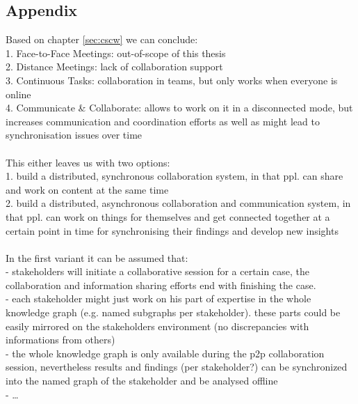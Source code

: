 
\begin{appendices}
\renewcommand{\appendixname}{APPENDIX}
\renewcommand{\appendixtocname}{\appendixname}
\addappheadtotoc


\part*{Appendix}

Based on chapter \ref{sec:cscw} we can conclude: \\
1. Face-to-Face Meetings: out-of-scope of this thesis \\
2. Distance Meetings: lack of collaboration support \\
3. Continuous Tasks: collaboration in teams, but only works when everyone is online \\
4. Communicate \& Collaborate: allows to work on it in a disconnected mode, but increases
communication and coordination efforts as well as might lead to synchronisation issues over time \\
\\
This either leaves us with two options: \\
1. build a distributed, synchronous collaboration system, in that ppl. can share and work on content at the same time \\
2. build a distributed, asynchronous collaboration and communication system, in that ppl. can work on things for themselves and
get connected together at a certain point in time for synchronising their findings and develop new insights \\
\\
In the first variant it can be assumed that: \\
- stakeholders will initiate a collaborative session for a certain case, the collaboration and information sharing efforts end
with finishing the case. \\
- each stakeholder might just work on his part of expertise in the whole knowledge graph (e.g. named subgraphs per stakeholder).
these parts could be easily mirrored on the stakeholders environment (no discrepancies with informations from others) \\
- the whole knowledge graph is only available during the p2p collaboration session, nevertheless results and findings (per stakeholder?)
can be synchronized into the named graph of the stakeholder and be analysed offline \\
- \ldots \\

\end{appendices}

